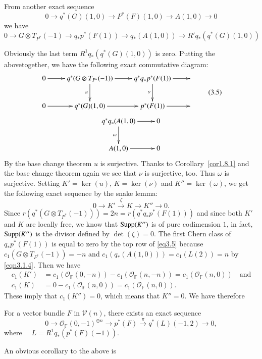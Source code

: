 From another exact sequence 
$$
0\to q^{\ast}(G)(1,0)\to P^{\ast}(F)(1,0)\to A(1,0)\to 0
$$
we have 
$$
0\to G\otimes T_{P^{\ast}}(-1)\to q_{\ast}p^{\ast}(F(1))\to
q_{\ast}(A(1,0))\to R' q_{\ast}(q^{\ast}(G)(1,0))
$$

Obviously the last term $R^{1}q_{\ast}(q^{\ast}(G)(1,0))$ is
zero. Putting the above\pageoriginale together, we have the following exact
commutative diagram: 
\begin{equation*}
\vcenter{
\xymatrix{0\ar[r]&q^{\ast}(G\otimes
  T_{P^{\ast}}(-1))\ar[d]_{u}\ar[r]&q^{\ast}q_{\ast}p^{\ast}(F(1))\ar[d]_{\nu}\ar[r]&\\
0\ar[r]&q^{\ast}(G)(1,0)\ar[r]&p^{\ast}(F(1))\ar[r]&}}\tag{3.5}\label{eq3.5}
\end{equation*}
$$
\xymatrix{q^{\ast}q_{\ast}(A(1,0)\ar[d]_{\omega}\ar[r]&0\\
A(1,0)\ar[r]&0}
$$
By the base change theorem $u$ is surjective. Thanks to
Corollary~\ref{cor1.8.1} and the base change theorem again we see that
$\nu$ is surjective, too. Thus $\omega$ is surjective. Setting
$K'=\ker(u)$, $K=\ker(\nu)$ and $K''=\ker(\omega)$, we get the
following exact sequence by the snake lemma: 
$$
0\to K'\xrightarrow{\zeta}K\to K''\to 0.
$$
Since $r(q^{\ast}(G\otimes
T_{P^{\ast}}(-1)))=2n=r(q^{\ast}q_{\ast}p^{\ast}(F(1)))$ and since both
$K'$ and $K$ are locally free, we know that $\mathrm{Supp}(K'')$ is of pure
codimension $1$, in fact, $\mathrm{Supp}(K'')$ is the divisor defined by
$\det(\zeta)=0$. The first Chern class of $q_{\ast}p^{\ast}(F(1))$
is equal to zero by the top row of \eqref{eq3.5} because $c_1(G\otimes
T_{P^{\ast}}(-1))=-n$ and $c_1(q_{\ast}(A(1,0)))=c_1(L(2))=n$ by
\eqref{eqn3.1.4}. Then we have
\begin{align*}
c_1(K') &
=c_1(\mathscr{O}_{\mathbb{F}}(0,-n))-c_1(\mathscr{O}_{\mathbb{F}}(n,-n))=c_1(\mathscr{O}_{\mathbb{F}}
(n,0))\quad\text{and}\\
c_1(K) &=0-c_1(\mathscr{O}_{\mathbb{F}}(n,0))=c_1(\mathscr{O}_{\mathbb{F}}(n,0)).
\end{align*}
\pageoriginale
These imply that $c_1(K'')=0$, which means that $K''=0$. We have therefore
\setcounter{dfn}{5}
\begin{Prop}\label{Prop3.6}
For a vector bundle $F$ in $\mathscr{V}(n)$, there exists an exact
sequence 
$$
0\to \mathscr{O}_{\mathbb{F}}(0,-1)^{\oplus n}\to
p^{\ast}(F)\xrightarrow{\pi}q^{\ast}(L)(-1,2)\to 0, 
$$
where~~ $L=R^{1}q_{\ast}(p^{\ast}(F)(-1))$.
\end{Prop}

An obvious corollary to the above is 


